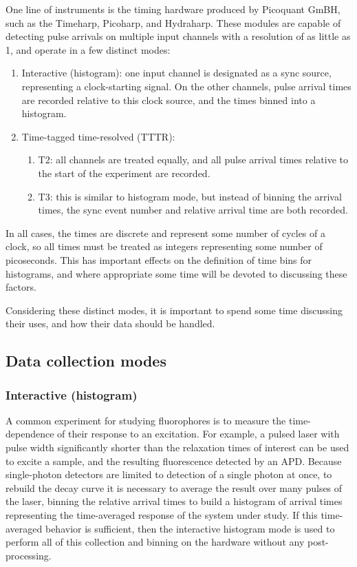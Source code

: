 \documentclass{article}
\begin{document}
One line of instruments is the timing hardware produced by Picoquant GmBH, such as the Timeharp, Picoharp, and Hydraharp. These modules are capable of detecting pulse arrivals on multiple input channels with a resolution of as little as 1\pico\second, and operate in a few distinct modes:
\begin{enumerate}
\item Interactive (histogram): one input channel is designated as a sync source, representing a clock-starting signal. On the other channels, pulse arrival times are recorded relative to this clock source, and the times binned into a histogram. 
\item Time-tagged time-resolved (TTTR): 
	\begin{enumerate}
	\item T2: all channels are treated equally, and all pulse arrival times relative to the start of the experiment are recorded. 
	\item T3: this is similar to histogram mode, but instead of binning the arrival times, the sync event number and relative arrival time are both recorded.
	\end{enumerate}
\end{enumerate}

In all cases, the times are discrete and represent some number of cycles of a clock, so all times must be treated as integers representing some number of picoseconds. This has important effects on the definition of time bins for histograms, and where appropriate some time will be devoted to discussing these factors. 

Considering these distinct modes, it is important to spend some time discussing their uses, and how their data should be handled.

\subsection{Data collection modes}
\subsubsection{Interactive (histogram)}
A common experiment for studying fluorophores is to measure the time-dependence of their response to an excitation. For example, a pulsed laser with pulse width significantly shorter than the relaxation times of interest can be used to excite a sample, and the resulting fluorescence detected by an APD. Because single-photon detectors are limited to detection of a single photon at once, to rebuild the decay curve it is necessary to average the result over many pulses of the laser, binning the relative arrival times to build a histogram of arrival times representing the time-averaged response of the system under study. If this time-averaged behavior is sufficient, then the interactive histogram mode is used to perform all of this collection and binning on the hardware without any post-processing. 
\end{document}
